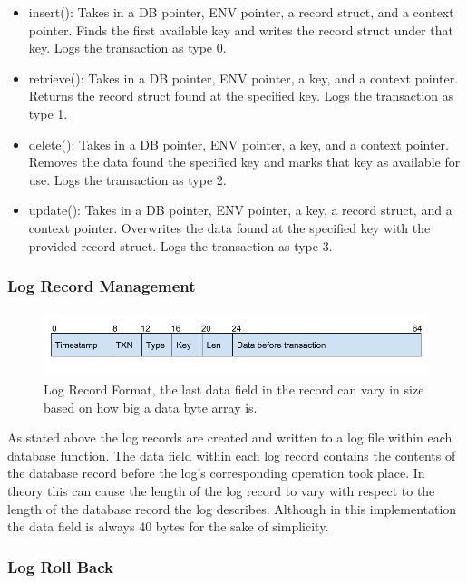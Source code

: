 \documentclass{article}
\begin{document}
\begin{itemize}[noitemsep]
    \item insert(): Takes in a DB pointer, ENV pointer, a record struct, and a context pointer. Finds the first available key and writes the record struct under that key. Logs the transaction as type 0.
    \item retrieve(): Takes in a DB pointer, ENV pointer, a key, and a context pointer. Returns the record struct found at the specified key. Logs the transaction as type 1.
    \item delete(): Takes in a DB pointer, ENV pointer, a key, and a context pointer. Removes the data found the specified key and marks that key as available for use. Logs the transaction as type 2.
    \item update(): Takes in a DB pointer, ENV pointer, a key, a record struct, and a context pointer. Overwrites the data found at the specified key with the provided record struct. Logs the transaction as type 3.
\end{itemize}

\subsubsection{Log Record Management}

\begin{figure}
    \centering
    \includegraphics[height=0.75in]{LogRecordFormat.png}
    \caption{Log Record Format, the last data field in the record can vary in size based on how big a data byte array is.}
    \label{fig:design2}
\end{figure}

As stated above the log records are created and written to a log file within each database function. The data field within each log record contains the contents of the database record before the log's corresponding operation took place. In theory this can cause the length of the log record to vary with respect to the length of the database record the log describes. Although in this implementation the data field is always 40 bytes for the sake of simplicity.

\subsubsection{Log Roll Back}
\end{document}
